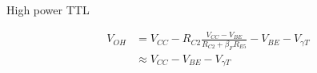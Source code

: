 \begin{frame}[label=10-s068]{High power TTL}
\setlength{\abovedisplayskip}{4pt}\setlength{\belowdisplayskip}{4pt}\setlength{\abovedisplayshortskip}{3pt}\setlength{\belowdisplayshortskip}{3pt}
\centering\par\vspace{1pt}

\[\begin{aligned}V_{OH}&=V_{CC}-R_{C2}\frac{V_{CC}-V_{BE}}{R_{C2}+\beta_FR_{E5}}-V_{BE}-V_{\gamma T}\\&\approx V_{CC}-V_{BE}-V_{\gamma T}\end{aligned}\]
\end{frame}
